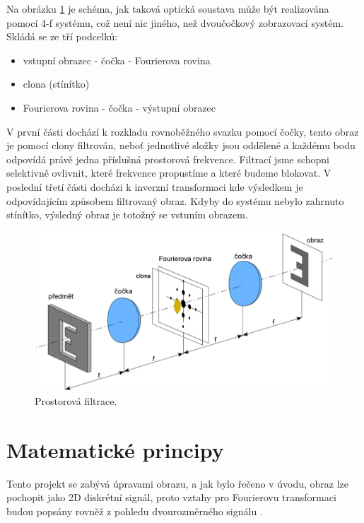 \documentclass[11pt,a4paper]{article}
\begin{document}
Na obrázku \ref{dft} je schéma, jak taková optická soustava může být realizována pomocí 4-f systému,
což není nic jiného, než dvoučočkový zobrazovací systém. Skládá se ze tří podcelků:

\begin{itemize}
\item vstupní obrazec - čočka - Fourierova rovina
\item clona (stínítko)
\item Fourierova rovina - čočka - výstupní obrazec 
\end{itemize}

V první části dochází k rozkladu rovnoběžného svazku pomocí čočky, tento obraz je pomocí
clony filtrován, neboť jednotlivé složky jsou oddělené a každému bodu odpovídá právě jedna příslušná
prostorová frekvence. Filtrací jsme schopni selektivně ovlivnit, které frekvence propustíme a které
budeme blokovat. V poslední třetí části docházi k inverzní transformaci kde výsledkem je
odpovídajícím způsobem filtrovaný obraz. Kdyby do systému nebylo zahrnuto stínítko, výsledný
obraz je totožný se vstuním obrazem.

\begin{figure}[H]
\centering
\includegraphics[width=14cm]{images/dft.png}
\caption{Prostorová filtrace.} %
\label{dft}
\end{figure}






\section{Matematické principy}
Tento projekt se zabývá úpravami obrazu, a jak bylo řečeno v úvodu, obraz lze pochopit jako 2D diskrétní 
signál, proto vztahy pro Fourierovu transformaci budou popsány rovněž z pohledu dvourozměrného signálu \cite{zre}.
\end{document}

